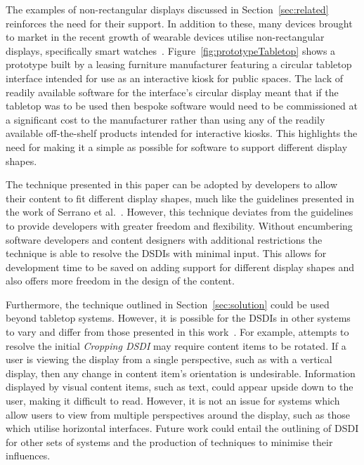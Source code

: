 \documentclass[twocolumn,compsoc]{cvm}
\begin{document}
{The examples of non-rectangular displays discussed in Section~\ref{sec:related} reinforces the need for their support.
In addition to these, many devices brought to market in the recent growth of wearable devices utilise non-rectangular displays, specifically smart watches~\cite{Jung2016}.
Figure~\ref{fig:prototypeTabletop} shows a prototype built by a leasing furniture manufacturer featuring a circular tabletop interface intended for use as an interactive kiosk for public spaces.
The lack of readily available software for the interface's circular display meant that if the tabletop was to be used then bespoke software would need to be commissioned at a significant cost to the manufacturer rather than using any of the readily available off-the-shelf products intended for interactive kiosks.
This highlights the need for making it a simple as possible for software to support different display shapes.

The technique presented in this paper can be adopted by developers to allow their content to fit different display shapes, much like the guidelines presented in the work of Serrano et al.~\cite{Serrano2016,Serrano2017}.
However, this technique deviates from the guidelines to provide developers with greater freedom and flexibility.
Without encumbering software developers and content designers with additional restrictions the technique is able to resolve the \acp{DSDI} with minimal input.
This allows for development time to be saved on adding support for different display shapes and also offers more freedom in the design of the content.

Furthermore, the technique outlined in Section~\ref{sec:solution} could be used beyond tabletop systems.
However, it is possible for the \acp{DSDI} in other systems to vary and differ from those presented in this work~\cite{Serrano2017}. 
For example, attempts to resolve the initial {\emph{Cropping \ac{DSDI}}} may require content items to be rotated.
If a user is viewing the display from a single perspective, such as with a vertical display, then any change in content item's orientation is undesirable.
Information displayed by visual content items, such as text, could appear upside down to the user, making it difficult to read.
However, it is not an issue for systems which allow users to view from multiple perspectives around the display, such as those which utilise horizontal interfaces.
Future work could entail the outlining of \ac{DSDI} for other sets of systems and the production of techniques to minimise their influences.

}
\end{document}
